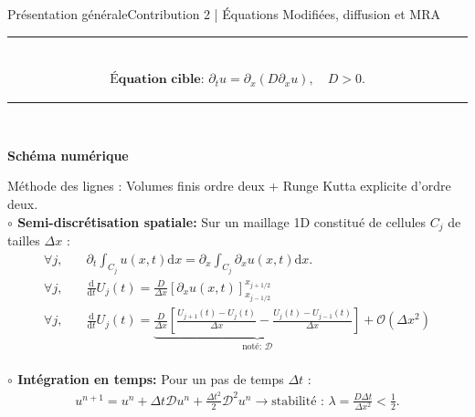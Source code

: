 \begin{frame}{Présentation générale}{Contribution 2 | Équations Modifiées, diffusion et MRA}
    \footnotesize
    \noindent\color{Primary}\rule{\linewidth}{0.6pt}\color{black}\\
        {\large\begin{align}\textbf{Équation cible: } \partial_t u = \partial_x \left( D \partial_{x}u \right), \quad D > 0.\end{align}}
    \noindent\color{Primary}\rule{\linewidth}{0.6pt}\color{black}\\
    \begin{center}\large\textbf{Schéma numérique}\end{center}
        Méthode des lignes : Volumes finis ordre deux + Runge Kutta explicite d'ordre deux.\\
        \textbf{$\circ$ Semi-discrétisation spatiale:} Sur un maillage 1D constitué de cellules $C_j$ de tailles $\Delta x$ : 
            \begin{align}
                \forall j,\quad &\partial_t \int_{C_j} u(x,t) \mathrm d x = \partial_x \int_{C_j} \partial_x u(x,t) \mathrm d x.\\
                \forall j,\quad &\frac{\mathrm d}{\mathrm{d}t}U_j(t) = \frac{D}{\Delta x} \left[\partial_x u(x,t)\right]^{x_{j+1/2}}_{x_{j-1/2}}\\
                \forall j,\quad &\frac{\mathrm d}{\mathrm{d}t}U_j(t) = \underbrace{\frac{D}{\Delta x} \left[
                    \frac{U_{j+1}(t) - U_{j}(t)}{\Delta x} - \frac{U_{j}(t) - U_{j-1}(t)}{\Delta x}
                \right]}_{\text{noté: } \mathcal D}+ \mathcal O(\Delta x^2)
            \end{align}\\
        \textbf{$\circ$ Intégration en temps:} Pour un pas de temps $\Delta t$ : 
        \begin{align}
            u^{n+1} = u^n + \Delta t \mathcal D u^n + \frac{\Delta t^2}{2} \mathcal D^2 u^n \rightarrow \text{stabilité : }\lambda = \frac{D \Delta t}{\Delta x^2} < \frac{1}{2}.
        \end{align}
\end{frame}